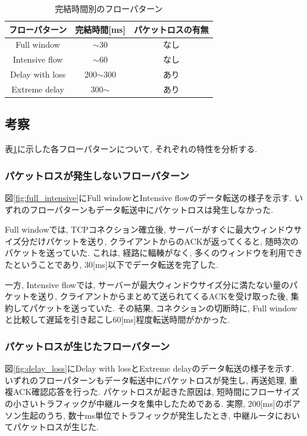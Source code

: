 \documentclass[technicalreport]{ieicej}
\begin{document}
\begin{table}[h]
\begin{center}
\begin{tabular}{c|c|c}
\hline
フローパターン & 完結時間[ms] & パケットロスの有無 \\ \hline \hline
Full window & $\sim$30 & なし\\
Intensive flow & $\sim$60 & なし\\
Delay with loss & 200$\sim$300 & あり\\
Extreme delay & 300$\sim$ & あり\\
\end{tabular}
\caption{完結時間別のフローパターン}
\label{table:flow_pattern}
\end{center}
\end{table}


\subsection{考察}
表\ref{table:flow_pattern}に示した各フローパターンについて, それぞれの特性を分析する.

\subsubsection{パケットロスが発生しないフローパターン}
図\ref{fig:full_intensive}にFull windowとIntensive flowのデータ転送の様子を示す.
いずれのフローパターンもデータ転送中にパケットロスは発生しなかった.

Full windowでは, TCPコネクション確立後, サーバーがすぐに最大ウィンドウサイズ分だけパケットを送り,
クライアントからのACKが返ってくると, 随時次のパケットを送っていた.
これは, 経路に輻輳がなく, 多くのウィンドウを利用できたということであり, 30[ms]以下でデータ転送を完了した.

一方, Intensive flowでは, サーバーが最大ウィンドウサイズ分に満たない量のパケットを送り,
クライアントからまとめて送られてくるACKを受け取った後, 集約してパケットを送っていた.
その結果, コネクションの切断時に, Full windowと比較して遅延を引き起こし60[ms]程度転送時間がかかった.


\subsubsection{パケットロスが生じたフローパターン}
図\ref{fig:delay_loss}にDelay with lossとExtreme delayのデータ転送の様子を示す.
いずれのフローパターンもデータ転送中にパケットロスが発生し, 再送処理, 重複ACK確認応答を行った.
パケットロスが起きた原因は, 短時間にフローサイズの小さいトラフィックが中継ルータを集中したためである.
実際, 200[ms]のポアソン生起のうち, 数十ms単位でトラフィックが発生したとき, 中継ルータにおいてパケットロスが生じた.
\end{document}
